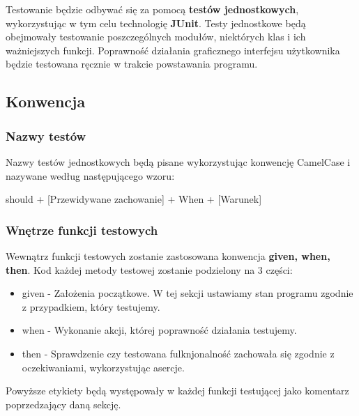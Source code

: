 \documentclass{article}
\begin{document}
    Testowanie będzie odbywać się za pomocą \textbf{testów jednostkowych}, wykorzystując w tym celu technologię \textbf{JUnit}. Testy jednostkowe będą obejmowały testowanie poszczególnych modułów, niektórych klas i ich ważniejszych funkcji. Poprawność działania graficznego interfejsu użytkownika będzie testowana ręcznie w trakcie powstawania programu.
    \subsection{Konwencja}
    \subsubsection{Nazwy testów}
    Nazwy testów jednostkowych będą pisane wykorzystując konwencję CamelCase i nazywane według następującego wzoru:
    \begin{center}
        should + [Przewidywane zachowanie] + When + [Warunek]
    \end{center}
    \subsubsection{Wnętrze funkcji testowych}
    Wewnątrz funkcji testowych zostanie zastosowana konwencja \textbf{given, when, then}. Kod każdej metody testowej zostanie podzielony na 3 części:
    \begin{itemize}
        \item given - Założenia początkowe. W tej sekcji ustawiamy stan programu zgodnie z przypadkiem, który testujemy.
        \item when - Wykonanie akcji, której poprawność działania testujemy.
        \item then - Sprawdzenie czy testowana fulknjonalność zachowała się zgodnie z oczekiwaniami, wykorzystując asercje.
    \end{itemize}
    Powyższe etykiety będą występowały w każdej funkcji testującej jako komentarz poprzedzający daną sekcję.
\end{document}
